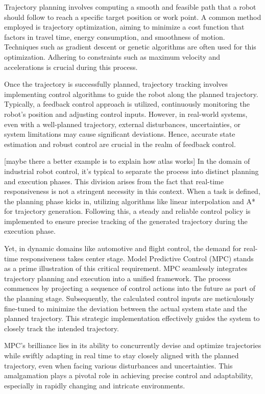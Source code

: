 Trajectory planning involves computing a smooth and feasible path that a robot should follow to reach a specific target position or work point. A common method employed is trajectory optimization, aiming to minimize a cost function that factors in travel time, energy consumption, and smoothness of motion. Techniques such as gradient descent or genetic algorithms are often used for this optimization. Adhering to constraints such as maximum velocity and accelerations is crucial during this process.

Once the trajectory is successfully planned, trajectory tracking involves implementing control algorithms to guide the robot along the planned trajectory. Typically, a feedback control approach is utilized, continuously monitoring the robot's position and adjusting control inputs. However, in real-world systems, even with a well-planned trajectory, external disturbances, uncertainties, or system limitations may cause significant deviations. Hence, accurate state estimation and robust control are crucial in the realm of feedback control.

[maybe there a better example is to explain how atlas works]
In the domain of industrial robot control, it's typical to separate the process into distinct planning and execution phases. This division arises from the fact that real-time responsiveness is not a stringent necessity in this context. When a task is defined, the planning phase kicks in, utilizing algorithms like linear interpolation and A* for trajectory generation. Following this, a steady and reliable control policy is implemented to ensure precise tracking of the generated trajectory during the execution phase.

Yet, in dynamic domains like automotive and flight control, the demand for real-time responsiveness takes center stage. Model Predictive Control (MPC) stands as a prime illustration of this critical requirement. MPC seamlessly integrates trajectory planning and execution into a unified framework. The process commences by projecting a sequence of control actions into the future as part of the planning stage. Subsequently, the calculated control inputs are meticulously fine-tuned to minimize the deviation between the actual system state and the planned trajectory. This strategic implementation effectively guides the system to closely track the intended trajectory.

MPC's brilliance lies in its ability to concurrently devise and optimize trajectories while swiftly adapting in real time to stay closely aligned with the planned trajectory, even when facing various disturbances and uncertainties. This amalgamation plays a pivotal role in achieving precise control and adaptability, especially in rapidly changing and intricate environments.

